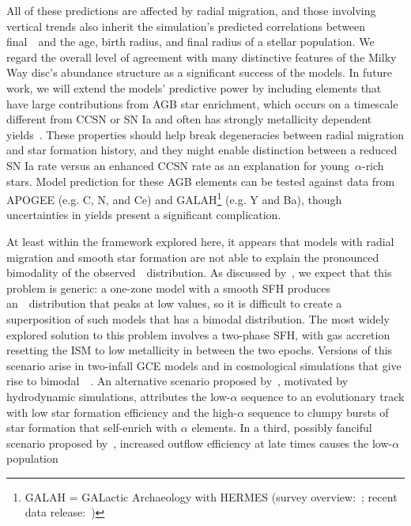 \documentclass[draft2.tex]{subfiles}
\begin{document}
All of these predictions are affected by radial migration, and those involving 
vertical trends also inherit the simulation's predicted correlations between 
final~\absz~and the age, birth radius, and final radius of a stellar 
population. 
We regard the overall level of agreement with many distinctive features of the 
Milky Way disc's abundance structure as a significant success of the models. 
In future work, we will extend the models' predictive power by including 
elements that have large contributions from AGB star enrichment, which occurs 
on a timescale different from CCSN or SN Ia and often has strongly 
metallicity dependent yields~\citep[e.g.][]{Cristallo2011, Cristallo2015}. 
These properties should help break degeneracies between radial migration and 
star formation history, and they might enable distinction between a reduced 
SN Ia rate versus an enhanced CCSN rate as an explanation for 
young~$\alpha$-rich stars. 
Model prediction for these AGB elements can be tested against data from 
APOGEE (e.g. C, N, and Ce) and GALAH\footnote{
	GALAH = GALactic Archaeology with HERMES 
	(survey overview:~\citealp{Martell2017}; 
	recent data release:~\citealp{Buder2021}) 
} (e.g. Y and Ba), though uncertainties in yields present a significant 
complication.
\par 
At least within the framework explored here, it appears that models 
with radial migration and smooth star formation are not able to explain the 
pronounced bimodality of the observed~\afe~distribution. 
As discussed by~\citet{Vincenzo2021a}, we expect that this problem is generic: 
a one-zone model with a smooth SFH produces an~\afe~distribution that peaks at 
low values, so it is difficult to create a superposition of such models that 
has a bimodal distribution. 
The most widely explored solution to this problem involves a two-phase SFH, 
with gas accretion resetting the ISM to low metallicity in between the two 
epochs. 
Versions of this scenario arise in two-infall GCE models 
\citep[e.g.][]{Chiappini1997, Spitoni2019a, Khoperskov2021} and in cosmological 
simulations that give rise to bimodal~\afe~\citep{Mackereth2018, Grand2018, 
Buck2020b}. 
An alternative scenario proposed by~\citet{Clarke2019}, motivated by 
hydrodynamic simulations, attributes the low-$\alpha$ sequence to an 
evolutionary track with low star formation efficiency and the high-$\alpha$ 
sequence to clumpy bursts of star formation that self-enrich with $\alpha$ 
elements. 
In a third, possibly fanciful scenario proposed by~\citet{Weinberg2017}, 
increased outflow efficiency at late times causes the low-$\alpha$ population 
\end{document}
